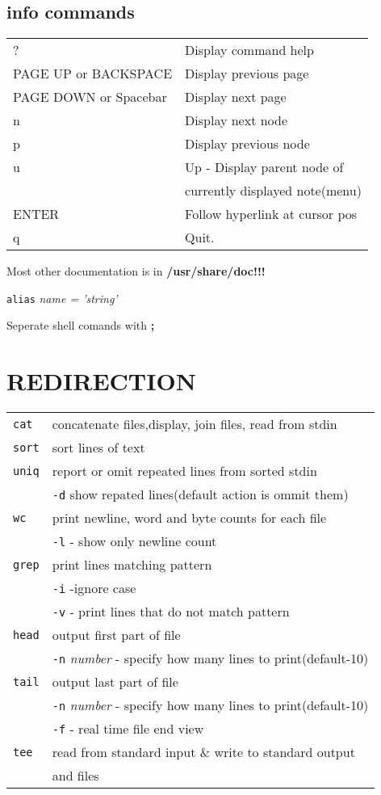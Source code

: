 \documentclass[8pt]{extarticle}
\begin{document}
\begin{multicols}{2}
\subsection{info commands}
\begin{tabular}{ll}
? &	Display command help\\
PAGE UP or BACKSPACE & Display previous page\\
PAGE DOWN or Spacebar & Display next page\\
n &	Display next node\\
p &	Display previous node\\
u &	Up - Display parent node of \\ &currently displayed note(menu)\\
ENTER &	Follow hyperlink at cursor pos\\
q &	Quit.
\end{tabular}

Most other documentation is in \textbf{/usr/share/doc!!!}

\texttt{alias} \textit{name = 'string'}

Seperate shell comands with \textbf{;}

\section{REDIRECTION}

\begin{tabular}{ll}
\texttt{cat} & concatenate files,display, join files, read from stdin\\
\texttt{sort} & sort lines of text\\
\texttt{uniq} & report or omit repeated lines from sorted stdin\\
& \texttt{-d} show repated lines(default action is ommit them)\\
\texttt{wc} & print newline, word and byte counts for each file\\
& \texttt{-l} - show only newline count\\
\texttt{grep} & print lines matching pattern\\
& \texttt{-i} -ignore case\\
& \texttt{-v} - print lines that do not match pattern\\
\texttt{head} & output first part of file\\
& \texttt{-n} \textit{number} - specify how many lines to print(default-10)\\
\texttt{tail} & output last part of file\\
& \texttt{-n} \textit{number} - specify how many lines to print(default-10)\\
& \texttt{-f} - real time file end view\\
\texttt{tee} & read from standard input \& write to standard output \\
& and files
\end{tabular}


\end{multicols}
\end{document}
